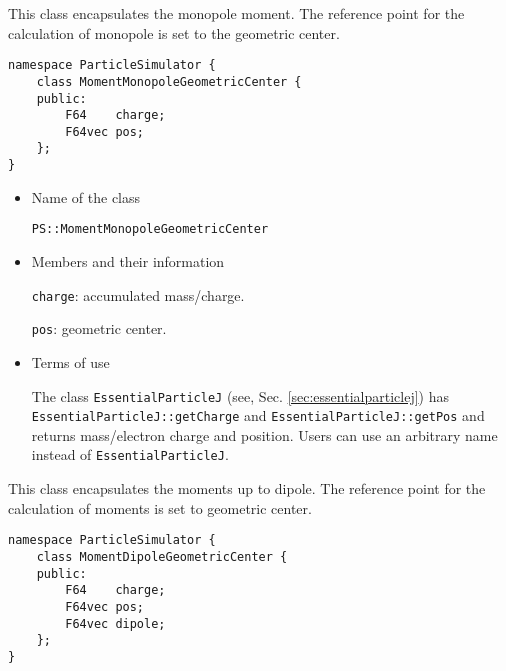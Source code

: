 \label{sec:MomentMonopoleGeometricCenter}


This class encapsulates the monopole moment.
The reference point for the calculation of monopole is set to the geometric center.

\begin{screen}
\begin{verbatim}
namespace ParticleSimulator {
    class MomentMonopoleGeometricCenter {
    public:
        F64    charge;    
        F64vec pos;
    };
}
\end{verbatim}
\end{screen}

\begin{itemize}

\item Name of the class

  \texttt{PS::MomentMonopoleGeometricCenter}

\item Members and their information

  \texttt{charge}: accumulated mass/charge.

  \texttt{pos}: geometric center.

\item Terms of use

  The class \texttt{EssentialParticleJ} (see, Sec. \ref{sec:essentialparticlej}) has \texttt{EssentialParticleJ::getCharge} and \texttt{EssentialParticleJ::getPos}
  and returns mass/electron charge and position.
  Users can use an arbitrary name instead of \texttt{EssentialParticleJ}.

\end{itemize}

\label{sec:MomentDipoleGeometricCenter}

This class encapsulates the moments up to dipole.
The reference point for the calculation of moments is set to geometric center.

\begin{screen}
\begin{verbatim}
namespace ParticleSimulator {
    class MomentDipoleGeometricCenter {
    public:
        F64    charge;    
        F64vec pos;
        F64vec dipole;
    };
}
\end{verbatim}
\end{screen}

